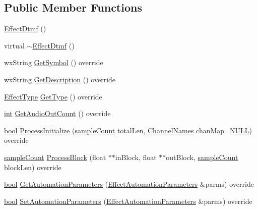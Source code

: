 \subsection*{Public Member Functions}
\begin{DoxyCompactItemize}
\item 
\hyperlink{class_effect_dtmf_a0045b8103de0ba022a45c242abba2d1f}{Effect\+Dtmf} ()
\item 
virtual \hyperlink{class_effect_dtmf_a2975ec527f9cc1f689faa6962bc2f6bd}{$\sim$\+Effect\+Dtmf} ()
\item 
wx\+String \hyperlink{class_effect_dtmf_adc05b4f765a403bd2fff0f10ee4a5895}{Get\+Symbol} () override
\item 
wx\+String \hyperlink{class_effect_dtmf_a4cc5dc19f11609f2807c96c1982e1ac4}{Get\+Description} () override
\item 
\hyperlink{_effect_interface_8h_a4809a7bb3fd1a421902a667cc1405d43}{Effect\+Type} \hyperlink{class_effect_dtmf_a9e76b361bfbfa20f0245c2079782d836}{Get\+Type} () override
\item 
\hyperlink{xmltok_8h_a5a0d4a5641ce434f1d23533f2b2e6653}{int} \hyperlink{class_effect_dtmf_a6c91a990ded8748357119e470e3b1a67}{Get\+Audio\+Out\+Count} () override
\item 
\hyperlink{mac_2config_2i386_2lib-src_2libsoxr_2soxr-config_8h_abb452686968e48b67397da5f97445f5b}{bool} \hyperlink{class_effect_dtmf_a33f49909417d69837595d8c598ec220a}{Process\+Initialize} (\hyperlink{include_2audacity_2_types_8h_afa427e1f521ea5ec12d054e8bd4d0f71}{sample\+Count} total\+Len, \hyperlink{include_2audacity_2_types_8h_a4f0f42a04250c39bbe0ce6cb26aa3b48}{Channel\+Names} chan\+Map=\hyperlink{px__mixer_8h_a070d2ce7b6bb7e5c05602aa8c308d0c4}{N\+U\+LL}) override
\item 
\hyperlink{include_2audacity_2_types_8h_afa427e1f521ea5ec12d054e8bd4d0f71}{sample\+Count} \hyperlink{class_effect_dtmf_a74009377e8f22f2f9c266537d716327f}{Process\+Block} (float $\ast$$\ast$in\+Block, float $\ast$$\ast$out\+Block, \hyperlink{include_2audacity_2_types_8h_afa427e1f521ea5ec12d054e8bd4d0f71}{sample\+Count} block\+Len) override
\item 
\hyperlink{mac_2config_2i386_2lib-src_2libsoxr_2soxr-config_8h_abb452686968e48b67397da5f97445f5b}{bool} \hyperlink{class_effect_dtmf_a9b576bdacf495fa63b0313eea97dffc0}{Get\+Automation\+Parameters} (\hyperlink{class_effect_automation_parameters}{Effect\+Automation\+Parameters} \&parms) override
\item 
\hyperlink{mac_2config_2i386_2lib-src_2libsoxr_2soxr-config_8h_abb452686968e48b67397da5f97445f5b}{bool} \hyperlink{class_effect_dtmf_a4f2104ba86bf9b0d55951bfa267ad4ff}{Set\+Automation\+Parameters} (\hyperlink{class_effect_automation_parameters}{Effect\+Automation\+Parameters} \&parms) override

\end{DoxyCompactItemize}
